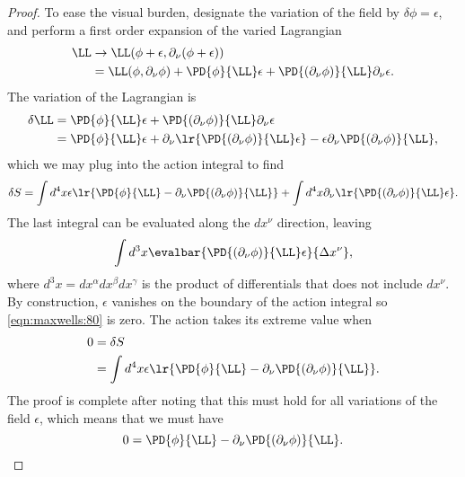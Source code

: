 \begin{proof}
To ease the visual burden, designate the variation of the field by \( \delta \phi = \epsilon \), and perform a first order expansion of the varied Lagrangian
\begin{equation}\label{eqn:maxwells:20}
\begin{aligned}
\LL
&\rightarrow
\LL(\phi + \epsilon, \partial_\nu (\phi + \epsilon)) \\
&=
\LL(\phi, \partial_\nu \phi)
+
\PD{\phi}{\LL} \epsilon +
\PD{(\partial_\nu \phi)}{\LL} \partial_\nu \epsilon.
\end{aligned}
\end{equation}
The variation of the Lagrangian is
\begin{equation}\label{eqn:maxwells:40}
\begin{aligned}
\delta \LL
&=
\PD{\phi}{\LL} \epsilon +
\PD{(\partial_\nu \phi)}{\LL} \partial_\nu \epsilon \\
&=
\PD{\phi}{\LL} \epsilon +
\partial_\nu \lr{ \PD{(\partial_\nu \phi)}{\LL} \epsilon }
-
\epsilon \partial_\nu \PD{(\partial_\nu \phi)}{\LL},
\end{aligned}
\end{equation}
which we may plug into the action integral to find
\begin{equation}\label{eqn:maxwells:60}
   \delta S =
   \int d^4 x \epsilon \lr{
   \PD{\phi}{\LL}
   -
   \partial_\nu \PD{(\partial_\nu \phi)}{\LL}
}
+
   \int d^4 x
\partial_\nu \lr{ \PD{(\partial_\nu \phi)}{\LL} \epsilon }.
\end{equation}
The last integral can be evaluated along the \( dx^\nu \) direction, leaving
\begin{equation}\label{eqn:maxwells:80}
   \int d^3 x
   \evalbar{ \PD{(\partial_\nu \phi)}{\LL} \epsilon }{\Delta x^\nu},
\end{equation}
where \( d^3 x = dx^\alpha dx^\beta dx^\gamma \) is the product of differentials that does not include \( dx^\nu \).  By construction, \( \epsilon \) vanishes on the boundary of the action integral so \cref{eqn:maxwells:80} is zero.  The action takes its extreme value when
\begin{equation}\label{eqn:maxwells:100}
\begin{aligned}
   0 &= \delta S \\
     &=
\int d^4 x \epsilon \lr{
   \PD{\phi}{\LL}
   -
   \partial_\nu \PD{(\partial_\nu \phi)}{\LL}
}.
\end{aligned}
\end{equation}
The proof is complete after noting that this must hold for all variations of the field \( \epsilon \), which means that we must have
\begin{equation}\label{eqn:maxwells:120}
0  =
   \PD{\phi}{\LL}
   -
   \partial_\nu \PD{(\partial_\nu \phi)}{\LL}.
\end{equation}
\end{proof}
